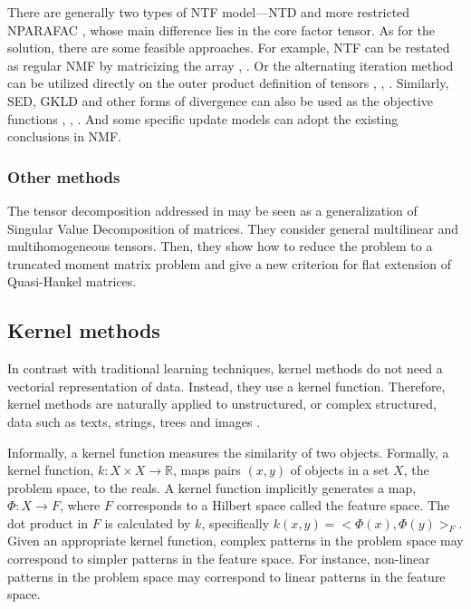 \documentclass[letterpaper,12pt]{article}
\begin{document}
There are generally two types of NTF model—NTD \cite{Morup2008} and more restricted NPARAFAC \cite{Hazan2005}, whose main difference lies in the core factor tensor. As for the solution, there are some feasible approaches. For example, NTF can be restated as regular NMF by matricizing the array \cite{Welling2001}, \cite{Morup2008}. Or the alternating iteration method can be utilized directly on the outer product definition of tensors \cite{Hazan2005}, \cite{Shashua2005}, \cite{Benetos2010}. Similarly, SED, GKLD and other forms of divergence can also be used as the objective functions \cite{Benetos2010}, \cite{Cichocki2007}, \cite{Zafeiriou2011}. And some specific update models can adopt the existing conclusions in NMF. %




\subsubsection{Other methods}

 The tensor decomposition addressed in \cite{Bernardi2013} may be seen as a generalization of Singular Value Decomposition of matrices. They consider general multilinear and multihomogeneous tensors. Then, they show how to reduce the problem to a truncated moment matrix problem and give a new criterion for flat extension of Quasi-Hankel matrices. 

 
\subsection{Kernel methods}

In contrast with traditional learning techniques, kernel methods do not need a vectorial representation of data. Instead, they use a kernel function. Therefore, kernel methods are naturally applied to unstructured, or complex structured, data such as texts, strings, trees and images \cite{Shawe-Taylor2004}. 

Informally, a kernel function measures the similarity of two objects. Formally, a kernel function, $k:X\times X\rightarrow\mathbb{R}$,
maps pairs $(x,y)$ of objects in a set $X$, the problem space, to the reals. A kernel function implicitly generates a map, $\Phi:X\rightarrow F$, where $F$ corresponds to a Hilbert space called the feature space. The dot product in $F$ is calculated by $k$, specifically $k(x,y)=<\Phi(x),\Phi(y)>_{F}$. Given an appropriate kernel function, complex patterns in the problem space may correspond to simpler patterns in the feature space. For instance, non-linear patterns in the problem space may correspond to linear patterns in the feature space. 
\end{document}
